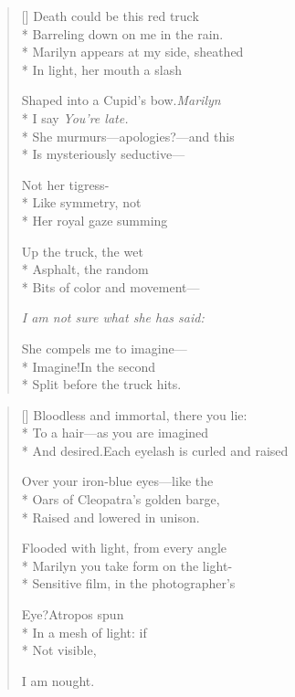 \label{ch:downtown_waiting_for_marilyn}
\begin{verse}[\versewidth]
Death could be this red truck\\*
Barreling down on me in the rain.\\*
Marilyn appears at my side, sheathed\\*
In light, her mouth a slash

Shaped into a Cupid's bow.\quad \textit{Marilyn}\\*
I say \qquad\qquad \textit{You're late.}\\*
She murmurs---apologies?---and this\\*
Is mysteriously seductive---

Not her tigress-\\*
Like symmetry, not\\*
Her royal gaze summing

Up the truck, the wet\\*
Asphalt, the random\\*
Bits of color and movement---

\textit{I am not sure what she has said:}

She compels me to imagine---\\*
Imagine!\quad In the second\\*
Split before the truck hits.
\end{verse}

\clearpage
{}
\label{ch:photograph}
\settowidth{\versewidth}{And desired.\quad Each eyelash is curled and raised}
\begin{verse}[\versewidth]
Bloodless and immortal, there you lie:\\*
To a hair---as you are imagined\\*
And desired.\quad Each eyelash is curled and raised

Over your iron-blue eyes---like the\\*
Oars of Cleopatra's golden barge,\\*
Raised and lowered in unison.

Flooded with light, from every angle\\*
Marilyn you take form on the light-\\*
Sensitive film, in the photographer's

Eye?\quad Atropos spun\\*
In a mesh of light:  if\\*
Not visible,

I am nought.
\end{verse}
\endgroup